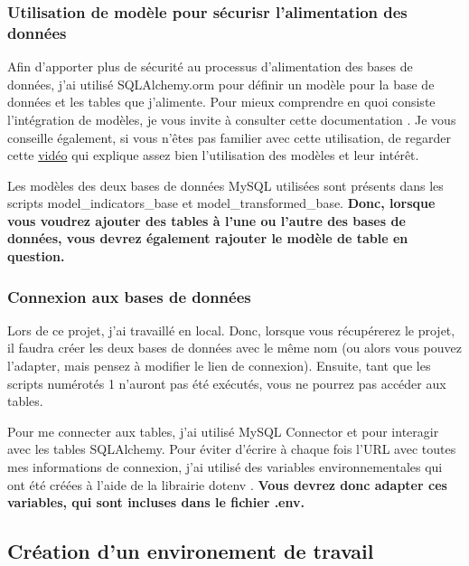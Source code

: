 \documentclass[12pt]{article}
\begin{document}
\subsubsection{Utilisation de modèle pour sécurisr l'alimentation des données}

Afin d'apporter plus de sécurité au processus d'alimentation des bases de données, 
j'ai utilisé SQLAlchemy.orm pour définir un modèle pour la base de données 
et les tables que j'alimente. Pour mieux comprendre en quoi consiste l'intégration de modèles, 
je vous invite à consulter cette documentation \cite{mapp}. Je vous conseille également, 
si vous n'êtes pas familier avec cette utilisation, de regarder cette
\href{https://www.youtube.com/watch?v=g0-7TrVCNtg}{vidéo} qui explique assez 
bien l'utilisation des modèles et leur intérêt.\newline

Les modèles des deux bases de données MySQL utilisées sont présents dans 
les scripts model\_indicators\_base et model\_transformed\_base. \textbf{Donc, lorsque 
vous voudrez ajouter des tables à l'une ou l'autre des bases de données, 
vous devrez également rajouter le modèle de table en question.}


\subsubsection{Connexion aux bases de données}

Lors de ce projet, j'ai travaillé en local. Donc, lorsque vous récupérerez le projet, 
il faudra créer les deux bases de données avec le même nom (ou alors vous pouvez l’adapter, 
mais pensez à modifier le lien de connexion). Ensuite, tant que les scripts numérotés 
1 n'auront pas été exécutés, vous ne pourrez pas accéder aux tables.\newline

Pour me connecter aux tables, j'ai utilisé MySQL Connector et pour interagir avec les 
tables SQLAlchemy. Pour éviter d'écrire à chaque fois l'URL avec toutes mes informations 
de connexion, j'ai utilisé des variables environnementales qui ont été créées à l'aide de 
la librairie dotenv \cite{dotenve}. \textbf{Vous devrez donc adapter ces variables, qui sont incluses 
dans le fichier .env.}



\subsection{Création d'un environement de travail}
\end{document}

